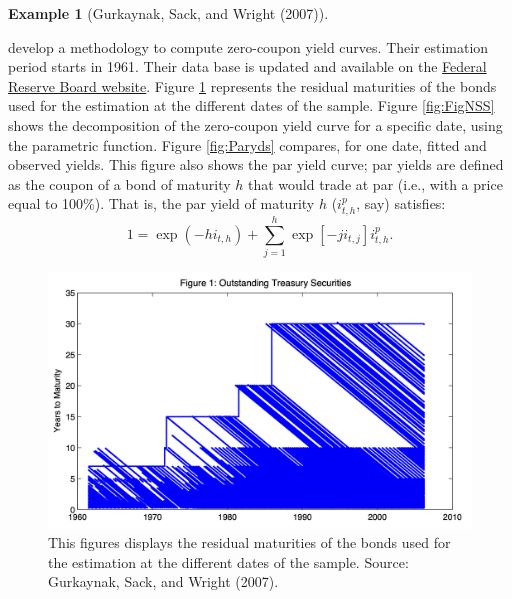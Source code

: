 \documentclass[
  12pt,
]{book}
\theoremstyle{definition}
\theoremstyle{definition}
\newtheorem{example}{Example}[chapter]
\theoremstyle{definition}
\theoremstyle{definition}
\theoremstyle{remark}
\begin{document}
\begin{example}[Gurkaynak, Sack, and Wright (2007)]
\protect\hypertarget{exm:GSW1961}{}\label{exm:GSW1961}

\citet{GURKAYNAK20072291} develop a methodology to compute zero-coupon yield curves. Their estimation period starts in 1961. Their data base is updated and available on the \href{https://www.federalreserve.gov/pubs/feds/2006/200628/200628abs.html}{Federal Reserve Board website}. Figure \ref{fig:BdPortfolio} represents the residual maturities of the bonds used for the estimation at the different dates of the sample. Figure \ref{fig:FigNSS} shows the decomposition of the zero-coupon yield curve for a specific date, using the \citet{Svensson_1994} parametric function. Figure \ref{fig:Paryds} compares, for one date, fitted and observed yields. This figure also shows the par yield curve; par yields are defined as the coupon of a bond of maturity \(h\) that would trade at par (i.e., with a price equal to 100\%). That is, the par yield of maturity \(h\) (\(i^p_{t,h}\), say) satisfies:
\begin{equation}
1 = \exp(-h i_{t,h}) + \sum_{j=1}^h \exp\left[-j i_{t,j}\right]i^p_{t,h}.\label{eq:paryields}
\end{equation}

\begin{figure}

{\centering \includegraphics[width=0.9\linewidth]{figures/Fig_BdPortfolio} 

}

\caption{This figures displays the residual maturities of the bonds used for the estimation at the different dates of the sample. Source: Gurkaynak, Sack, and Wright (2007).}\label{fig:BdPortfolio}
\end{figure}

\begin{figure}


\end{figure}
\end{example}
\end{document}

